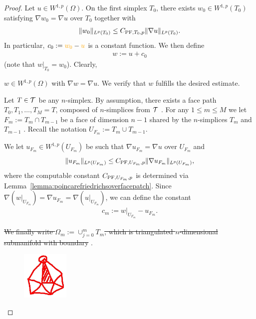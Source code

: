 \documentclass[10pt,letterpaper]{article}
\newcommand\cye[1]{%
  \protect\leavevmode
  \begingroup
    \color{red!35!yellow}%
    #1%
  \endgroup
}
\begin{document}
\begin{proof}
 Let $u \in W^{1,p}(\Omega)$. 
 \cye{On the first} simplex $T_{0}$, there exists $w_0 \in W^{1,p}(T_{0})$ satisfying $\nabla w_0 = \nabla u$ over $T_{0}$ together with 
 \begin{gather*}
    \| w_0 \|_{L^{p}(T_{0})} \leq C_{{\rm{PF}},T_{0},p} \| \nabla u \|_{L^{p}(T_{0})}.
 \end{gather*}
 In particular, $c_{0} := \cye{w_0} - \cye{u}$ is a constant function. 
 \cye{We then define 
  \begin{align*}
    w := u + c_0
  \end{align*} 
  (note that $w|_{T_{0}} = w_0$). Clearly,} 
 $w \in W^{1,p}(\Omega)$ with $\nabla w = \nabla u$. \cye{We verify that $w$ fulfills the desired estimate.}
 
 Let $T \in {\mathcal T}$ be any $n$-simplex. 
 By assumption, there exists a \cye{face} path $T_0, T_1, \dots, T_M = T$, composed of $n$-simplices \cye{from ${\mathcal T}$}. 
 For any $1 \leq m \leq M$ we let $F_m := T_m \cap T_{m-1}$ be a face of dimension $n-1$ \cye{shared by the $n$-simplices $T_m$ and $T_{m-1}$}. \cye{Recall the notation $U_{F_m} := T_m \cup T_{m-1}$.}
 We let $u_{F_m} \in W^{1,p}(U_{F_m})$ \cye{be} such that $\nabla u_{F_m} = \nabla u$ over $U_{F_m}$ and 
 \begin{align*}
    \| u_{F_m} \|_{L^{p}(U_{F_m})} \leq C_{{\rm{PF}},U_{F_m},p} \| \nabla u_{F_m} \|_{L^{p}(U_{F_m})},
 \end{align*}
 where the computable constant $C_{{\rm{PF}},U_{F_m},p}$ is determined via Lemma~\ref{lemma:poincarefriedrichsoverfacepatch}. \cye{Since $\nabla (w|_{U_{F_m}}) = \nabla u_{F_{m}} = \nabla (u|_{U_{F_m}})$, we can define the constant
 \begin{align*}
    c_{m} := w|_{U_{F_m}} - u_{F_{m}}.
 \end{align*}
 }
 \cye{\sout{We finally write $\Omega_m := \cup_{j=0}^{m} T_m$, which is triangulated $n$-dimensional submanifold with boundary}}.

\begin{figure}[h]
\centerline{\includegraphics[width=0.2\textwidth]{homotopic_ball.jpg}}
\end{figure}


\end{proof}
\end{document}
